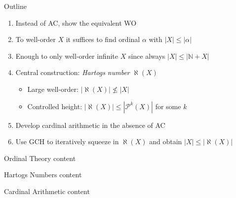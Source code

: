 \documentclass[xcolor=dvipsnames,compress,aspectratio=169,handout]{beamer}
\newcommand{\MBB}[1]{\ensuremath{\mathbb{#1}}\xspace}  %
\newcommand{\MCL}[1]{\ensuremath{\mathcal{#1}}\xspace} %
\newcommand{\Nat}{\MBB{N}}   %
\newcommand{\Pow}{\MCL P}
\newcommand{\hartogsNumber}{\aleph}
\begin{document}
\begin{frame}{Outline}
	\begin{enumerate}[<+->]
			\item
			Instead of AC, show the equivalent WO
			\vspace{0.4cm}
			\item
			To well-order $X$ it suffices to find ordinal $\alpha$ with $|X|\le |\alpha|$
			\vspace{0.4cm}
			\item
			Enough to only well-order infinite $X$ since always $|X|\le|\Nat + X|$
			\vspace{0.4cm}
			\item
			Central construction: \emph{Hartogs number} $\hartogsNumber(X)$
			\begin{itemize}
				\item
				\vspace{0.2cm}
				Large well-order: $|\hartogsNumber(X)|\not\le |X|$
				\vspace{0.2cm}
				\item
				Controlled height: $|\hartogsNumber(X)|\le|\Pow^k(X)|$ for some $k$
			\end{itemize}
			\vspace{0.4cm}
			\item
			Develop cardinal arithmetic in the absence of AC
			\vspace{0.4cm}
			\item
			Use GCH to iteratively squeeze in $\hartogsNumber(X)$ and obtain $|X|\le |\hartogsNumber(X)|$
		\end{enumerate}
\end{frame}

\begin{frame}{Ordinal Theory}
	content
\end{frame}

\begin{frame}{Hartogs Numbers}
	content
\end{frame}

\begin{frame}{Cardinal Arithmetic}
	content
\end{frame}
\end{document}

